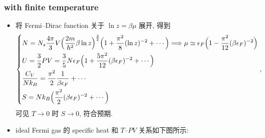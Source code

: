 \subsubsection{with finite temperature}
\begin{itemize}
	\item 将 Fermi--Dirac function 关于 $\ln z = \beta \mu$ 展开, 得到
	\begin{equation} \label{8.1.10}
		\begin{dcases}
			N = N_s \frac{4 \pi}{3} V \Big( \frac{2 m}{h^2} \beta \ln z \Big)^{\frac{3}{2}} \Big( 1 + \frac{\pi^2}{8} (\ln z)^{- 2} + \cdots \Big) \Longrightarrow \mu \simeq \epsilon_F \Big( 1 - \frac{\pi^2}{12} (\beta \epsilon_F)^{- 2} \Big) \\
			U = \frac{3}{2} P V = \frac{3}{5} N \epsilon_F \Big( 1 + \frac{5 \pi^2}{12} (\beta \epsilon_F)^{- 2} + \cdots \Big) \\
			\frac{C_V}{N k_B} = \frac{\pi^2}{2} \frac{1}{\beta \epsilon_F} + \cdots \\
			S = N k_B \Big( \frac{\pi^2}{2} (\beta \epsilon_F)^{- 2} + 
			\cdots \Big)
		\end{dcases},
	\end{equation}
	可见 $T \rightarrow 0$ 时 $S \rightarrow 0$, 符合预期.
	
	\item ideal Fermi gas 的 specific heat 和 $T$--$P V$ 关系如下图所示:
	

\end{itemize}
